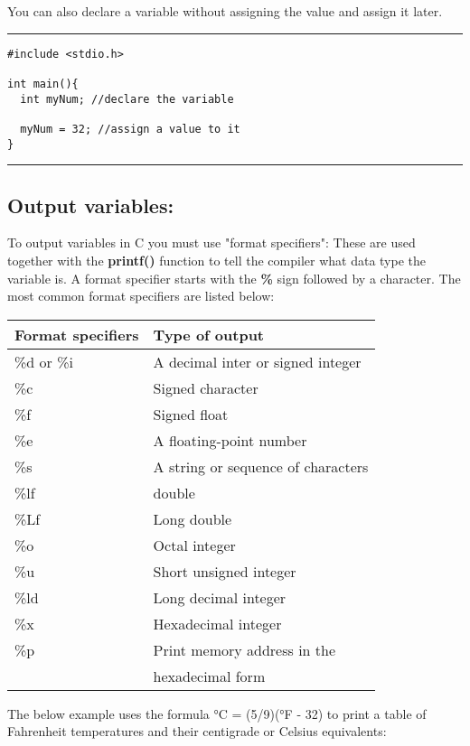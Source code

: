 \documentclass[a4paper]{article}
\begin{document}
You can also declare a variable without assigning the value and assign it
later.

\noindent\rule{\textwidth}{0.5pt}
\begin{verbatim}
#include <stdio.h>

int main(){
  int myNum; //declare the variable

  myNum = 32; //assign a value to it
}
\end{verbatim}

\noindent\rule{\textwidth}{0.5pt}

\subsection{Output variables:}
\label{sec:orgad47f9a}
To output variables in C you must use "format specifiers":
These are used together with the \textbf{printf()} function to tell the compiler what
data type the variable is.
A format specifier starts with the \textbf{\%} sign followed by a character.
The most common format specifiers are listed below:
\begin{center}
\begin{tabular}{l|l}
\hline
Format specifiers & Type of output\\
\hline
\%d or \%i & A decimal inter or signed integer\\
\hline
\%c & Signed character\\
\hline
\%f & Signed float\\
\hline
\%e & A floating-point number\\
\hline
\%s & A string or sequence of characters\\
\hline
\%lf & double\\
\hline
\%Lf & Long double\\
\hline
\%o & Octal integer\\
\hline
\%u & Short unsigned integer\\
\hline
\%ld & Long decimal integer\\
\hline
\%x & Hexadecimal integer\\
\hline
\%p & Print memory address in the\\
 & hexadecimal form\\
\hline
\end{tabular}
\end{center}

The below example uses the formula °C = (5/9)(°F - 32) to print a table of
Fahrenheit temperatures and their centigrade or Celsius equivalents:
\end{document}
